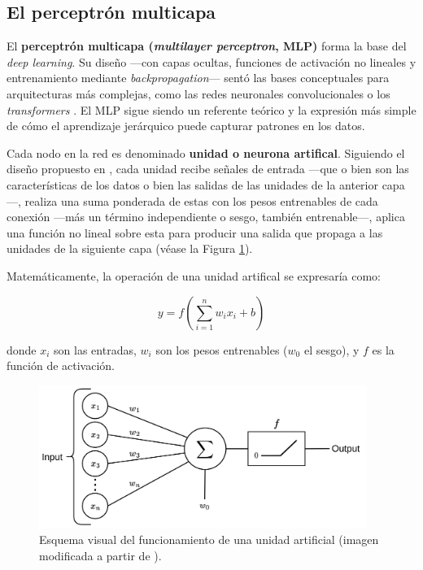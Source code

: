 \subsection{El perceptrón multicapa}

El \textbf{perceptrón multicapa (\textit{multilayer perceptron}, MLP)} forma la base del \textit{deep 
learning}. Su diseño ---con capas ocultas, funciones de activación no lineales y entrenamiento  mediante 
\textit{backpropagation}--- sentó las bases conceptuales para arquitecturas más complejas, como las redes 
neuronales convolucionales o los \textit{transformers} \cite{murphy2022}. El MLP sigue siendo un referente 
teórico y la expresión más simple de cómo el aprendizaje jerárquico puede capturar patrones en los datos. 

Cada nodo en la red es denominado \textbf{unidad o neurona artifical}. Siguiendo el diseño propuesto en 
\cite{mcculloch1943,rosenblatt1958}, cada unidad recibe señales de entrada ---que o bien son las 
características de los datos o bien las salidas de las unidades de la anterior capa---, realiza una suma 
ponderada de estas con los pesos entrenables de cada conexión ---más un término independiente o sesgo, también 
entrenable---, aplica una función no lineal sobre esta para producir una salida que propaga a las unidades de 
la siguiente capa (véase la Figura \ref{fig:neuron_MLP}).

Matemáticamente, la operación de una unidad artifical se expresaría como:

$$
y = f \left( \sum_{i=1}^n{w_ix_i+b} \right)
$$

donde $x_i$ son las entradas, $w_i$ son los pesos entrenables ($w_0$ el sesgo), y $f$ es la función de 
activación.

\begin{figure}[h]
    \centering
    \includegraphics[width=0.95\textwidth]{capitulos/cap_02/imagenes/Neuron_perceptron.png}
    \caption{
        Esquema visual del funcionamiento de una unidad artificial (imagen modificada a partir de 
        \cite{codeworld2022understandingMLDL}).
    } 
    \label{fig:neuron_MLP}
\end{figure}


